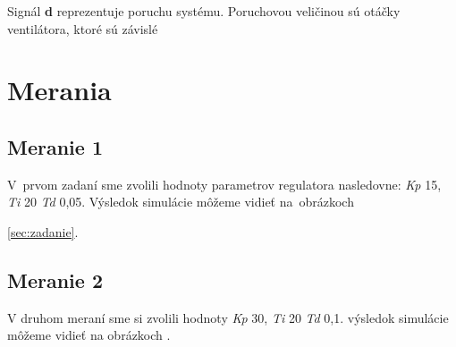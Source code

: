 \documentclass{article}
\begin{document}

Signál \textbf{d} reprezentuje poruchu systému. Poruchovou veličinou sú otáčky ventilátora, ktoré sú závislé

\section{Merania}
\label{sec:merania}

\subsection{Meranie 1}
\label{sec:meranie1}

V~prvom zadaní sme zvolili hodnoty parametrov regulatora nasledovne: \textit{Kp} 15, \textit{Ti} 20 \textit{Td} 0,05. Výsledok simulácie môžeme vidieť na~obrázkoch


\clearpage

\ref{sec:zadanie}.

\clearpage

\subsection{Meranie 2}
\label{sec:meranie2}

V druhom meraní sme si zvolili hodnoty \textit{Kp} 30, \textit{Ti} 20 \textit{Td} 0,1. výsledok simulácie môžeme vidieť na obrázkoch  .
\end{document}
